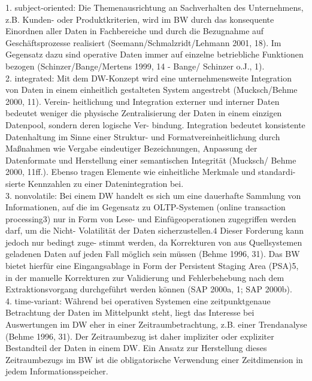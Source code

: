 1. subject-oriented: Die Themenausrichtung an Sachverhalten des Unternehmens, z.B. Kunden- oder Produktkriterien, wird im BW durch das konsequente Einordnen aller Daten in Fachbereiche und durch die Bezugnahme auf Geschäftsprozesse realisiert (Seemann/Schmalzridt/Lehmann 2001, 18). Im Gegensatz dazu sind operative Daten immer auf einzelne betriebliche Funktionen bezogen (Schinzer/Bange/Mertens 1999, 14 - Bange/ Schinzer o.J., 1). \\
2. integrated: Mit dem DW-Konzept wird eine unternehmensweite Integration von Daten in einem einheitlich gestalteten System angestrebt (Mucksch/Behme 2000, 11). Verein- heitlichung und Integration externer und interner Daten bedeutet weniger die physische Zentralisierung der Daten in einem einzigen Datenpool, sondern deren logische Ver- bindung. Integration bedeutet konsistente Datenhaltung im Sinne einer Struktur- und Formatvereinheitlichung durch Maßnahmen wie Vergabe eindeutiger Bezeichnungen, Anpassung der Datenformate und Herstellung einer semantischen Integrität (Mucksch/ Behme 2000, 11ff.). Ebenso tragen Elemente wie einheitliche Merkmale und standardi- sierte Kennzahlen zu einer Datenintegration bei.\\
3. nonvolatile: Bei einem DW handelt es sich um eine dauerhafte Sammlung von Informationen, auf die im Gegensatz zu OLTP-Systemen (online transaction processing3) nur in Form von Lese- und Einfügeoperationen zugegriffen werden darf, um die Nicht- Volatilität der Daten sicherzustellen.4 Dieser Forderung kann jedoch nur bedingt zuge- stimmt werden, da Korrekturen von aus Quellsystemen geladenen Daten auf jeden Fall möglich sein müssen (Behme 1996, 31). Das BW bietet hierfür eine Eingangsablage in Form der Persistent Staging Area (PSA)5, in der manuelle Korrekturen zur Validierung und Fehlerbehebung nach dem Extraktionsvorgang durchgeführt werden können (SAP 2000a, 1; SAP 2000b).\\
4. time-variant: Während bei operativen Systemen eine zeitpunktgenaue Betrachtung der Daten im Mittelpunkt steht, liegt das Interesse bei Auswertungen im DW eher in einer Zeitraumbetrachtung, z.B. einer Trendanalyse (Behme 1996, 31). Der Zeitraumbezug ist daher impliziter oder expliziter Bestandteil der Daten in einem DW. Ein Ansatz zur Herstellung dieses Zeitraumbezugs im BW ist die obligatorische Verwendung einer Zeitdimension in jedem Informationsspeicher.



